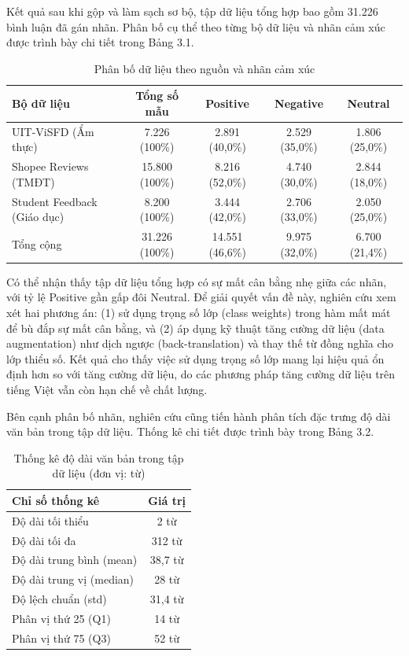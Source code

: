 \documentclass[14pt, a4paper]{report}
\begin{document}
Kết quả sau khi gộp và làm sạch sơ bộ, tập dữ liệu tổng hợp bao gồm 31.226 bình luận đã gán nhãn. Phân bố cụ thể theo từng bộ dữ liệu và nhãn cảm xúc được trình bày chi tiết trong Bảng 3.1.


\begin{table}[h]
\centering
\caption{Phân bố dữ liệu theo nguồn và nhãn cảm xúc}
\begin{tabular}{|l|c|c|c|c|}
\hline
\textbf{Bộ dữ liệu} & \textbf{Tổng số mẫu} & \textbf{Positive} & \textbf{Negative} & \textbf{Neutral} \\
\hline
UIT-ViSFD (Ẩm thực) & 7.226 (100\%) & 2.891 (40,0\%) & 2.529 (35,0\%) & 1.806 (25,0\%) \\
\hline
Shopee Reviews (TMĐT) & 15.800 (100\%) & 8.216 (52,0\%) & 4.740 (30,0\%) & 2.844 (18,0\%) \\
\hline
Student Feedback (Giáo dục) & 8.200 (100\%) & 3.444 (42,0\%) & 2.706 (33,0\%) & 2.050 (25,0\%) \\
\hline
Tổng cộng & 31.226 (100\%) & 14.551 (46,6\%) & 9.975 (32,0\%) & 6.700 (21,4\%) \\
\hline
\end{tabular}
\normalsize
\end{table}




Có thể nhận thấy tập dữ liệu tổng hợp có sự mất cân bằng nhẹ giữa các nhãn, với tỷ lệ Positive gần gấp đôi Neutral. Để giải quyết vấn đề này, nghiên cứu xem xét hai phương án: (1) sử dụng trọng số lớp (class weights) trong hàm mất mát để bù đắp sự mất cân bằng, và (2) áp dụng kỹ thuật tăng cường dữ liệu (data augmentation) như dịch ngược (back-translation) và thay thế từ đồng nghĩa cho lớp thiểu số. Kết quả cho thấy việc sử dụng trọng số lớp mang lại hiệu quả ổn định hơn so với tăng cường dữ liệu, do các phương pháp tăng cường dữ liệu trên tiếng Việt vẫn còn hạn chế về chất lượng.


Bên cạnh phân bố nhãn, nghiên cứu cũng tiến hành phân tích đặc trưng độ dài văn bản trong tập dữ liệu. Thống kê chi tiết được trình bày trong Bảng 3.2.


\begin{table}[h]
\centering
\caption{Thống kê độ dài văn bản trong tập dữ liệu (đơn vị: từ)}
\begin{tabular}{|l|c|}
\hline
\textbf{Chỉ số thống kê} & \textbf{Giá trị} \\
\hline
Độ dài tối thiểu & 2 từ \\
\hline
Độ dài tối đa & 312 từ \\
\hline
Độ dài trung bình (mean) & 38,7 từ \\
\hline
Độ dài trung vị (median) & 28 từ \\
\hline
Độ lệch chuẩn (std) & 31,4 từ \\
\hline
Phân vị thứ 25 (Q1) & 14 từ \\
\hline
Phân vị thứ 75 (Q3) & 52 từ \\
\hline
\end{tabular}
\normalsize
\end{table}
\end{document}
